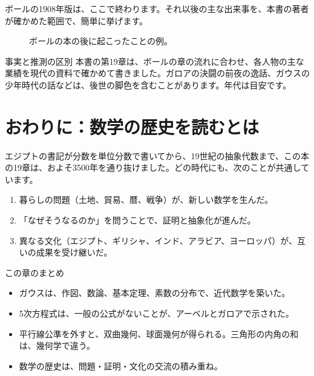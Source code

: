 \documentclass[a4paper,11pt,openany]{ltjsbook}
\begin{document}
ボールの1908年版は、ここで終わります。それ以後の主な出来事を、本書の著者が確かめた範囲で、簡単に挙げます。

\begin{figure}[htbp]
\centering
{}
\caption{ボールの本の後に起こったことの例。}
\end{figure}

\begin{notebox}{事実と推測の区別}
本書の第19章は、ボールの章の流れに合わせ、各人物の主な業績を現代の資料で確かめて書きました。ガロアの決闘の前夜の逸話、ガウスの少年時代の話などは、後世の脚色を含むことがあります。年代は目安です。
\end{notebox}

\section{おわりに：数学の歴史を読むとは}

エジプトの書記が分数を単位分数で書いてから、19世紀の抽象代数まで、この本の19章は、およそ3500年を通り抜けました。どの時代にも、次のことが共通しています。

\begin{enumerate}[leftmargin=*]
\item 暮らしの問題（土地、貿易、暦、戦争）が、新しい数学を生んだ。
\item 「なぜそうなるのか」を問うことで、証明と抽象化が進んだ。
\item 異なる文化（エジプト、ギリシャ、インド、アラビア、ヨーロッパ）が、互いの成果を受け継いだ。
\end{enumerate}

\begin{pointbox}{この章のまとめ}
\begin{itemize}[leftmargin=*]
\item ガウスは、作図、数論、基本定理、素数の分布で、近代数学を築いた。
\item 5次方程式は、一般の公式がないことが、アーベルとガロアで示された。
\item 平行線公準を外すと、双曲幾何、球面幾何が得られる。三角形の内角の和は、幾何学で違う。
\item 数学の歴史は、問題・証明・文化の交流の積み重ね。
\end{itemize}
\end{pointbox}
\end{document}
